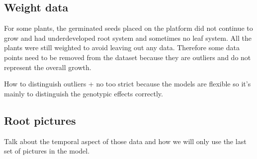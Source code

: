 \subsection{Weight data}
For some plants, the germinated seeds placed on the platform did not continue to grow and had underdeveloped root system and sometimes no leaf system. All the plants were still weighted to avoid leaving out any data. Therefore some data points need to be removed from the dataset because they are outliers and do not represent the overall growth.\\
\begin{formal}
How to distinguish outliers + no too strict because the models are flexible so it's mainly to distinguish the genotypic effects correctly.\\
\end{formal}
\subsection{Root pictures}
\begin{formal}
Talk about the temporal aspect of those data and how we will only use the last set of pictures in the model.
\end{formal}


